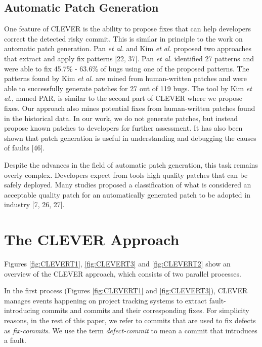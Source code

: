 \documentclass[sigconf]{acmart}
\begin{document}
\subsection{Automatic Patch
Generation}\label{automatic-patch-generation}

One feature of CLEVER is the ability to propose fixes that can help
developers correct the detected risky commit. This is similar in
principle to the work on automatic patch generation. Pan \emph{et al.}
and Kim \emph{et al.} proposed two approaches that extract and apply fix
patterns {[}22, 37{]}. Pan \emph{et al.} identified 27 patterns and were
able to fix 45.7\% - 63.6\% of bugs using one of the proposed patterns.
The patterns found by Kim \emph{et al.} are mined from human-written
patches and were able to successfully generate patches for 27 out of 119
bugs. The tool by Kim \emph{et al.}, named PAR, is similar to the second
part of CLEVER where we propose fixes. Our approach also mines potential
fixes from human-written patches found in the historical data. In our
work, we do not generate patches, but instead propose known patches to
developers for further assessment. It has also been shown that patch
generation is useful in understanding and debugging the causes of faults
{[}46{]}.

Despite the advances in the field of automatic patch generation, this
task remains overly complex. Developers expect from tools high quality
patches that can be safely deployed. Many studies proposed a
classification of what is considered an acceptable quality patch for an
automatically generated patch to be adopted in industry {[}7, 26, 27{]}.

\section{The CLEVER Approach}\label{sec:CLEVERT}

Figures \ref{fig:CLEVERT1}, \ref{fig:CLEVERT3} and \ref{fig:CLEVERT2}
show an overview of the CLEVER approach, which consists of two parallel
processes.

In the first process (Figures \ref{fig:CLEVERT1} and
\ref{fig:CLEVERT3}), CLEVER manages events happening on project tracking
systems to extract fault-introducing commits and commits and their
corresponding fixes. For simplicity reasons, in the rest of this paper,
we refer to commits that are used to fix defects as \emph{fix-commits}.
We use the term \emph{defect-commit} to mean a commit that introduces a
fault.
\end{document}
